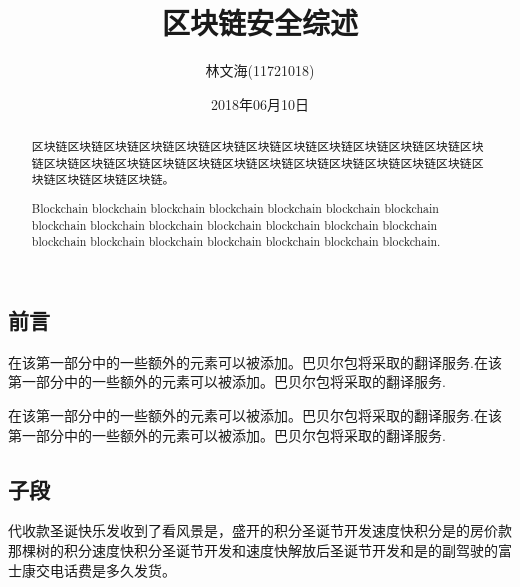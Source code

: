 \documentclass[a4paper, 11pt]{article}
\title{区块链安全综述}
\author{林文海(11721018)}
\date{2018年06月10日}
\begin{document}
    \setlength\parindent{2em}

        \renewcommand{\contentsname}{目录}  %
        \renewcommand{\abstractname}{摘要}  %
        \renewcommand{\refname}{参考文献}   %
        \renewcommand{\indexname}{索引}
        \renewcommand{\figurename}{图}
        \renewcommand{\tablename}{表}
        \renewcommand{\appendixname}{附录}
    
    \begin{CJK*}{UTF8}{gbsn}

    \maketitle
    
    \begin{abstract}
        区块链区块链区块链区块链区块链区块链区块链区块链区块链区块链区块链区块链区块链区块链区块链区块链区块链区块链区块链区块链区块链区块链区块链区块链区块链区块链区块链区块链区块链。
    \end{abstract}

    \renewcommand{\abstractname}{Abstract}

    \begin{abstract}
        Blockchain blockchain blockchain blockchain blockchain blockchain blockchain blockchain blockchain blockchain blockchain blockchain blockchain blockchain blockchain blockchain blockchain blockchain blockchain blockchain blockchain.
    \end{abstract}


    

    \section{前言}

    \indent

    在该第一部分中的一些额外的元素可以被添加。巴贝尔包将采取的翻译服务.在该第一部分中的一些额外的元素可以被添加。巴贝尔包将采取的翻译服务.

        在该第一部分中的一些额外的元素可以被添加。巴贝尔包将采取的翻译服务.在该第一部分中的一些额外的元素可以被添加。巴贝尔包将采取的翻译服务.


        \subsection{子段}
        代收款圣诞快乐发收到了看风景是，盛开的积分圣诞节开发速度快积分是的房价款那棵树的积分速度快积分圣诞节开发和速度快解放后圣诞节开发和是的副驾驶的富士康交电话费是多久发货。
    

\end{CJK*}
\end{document}
